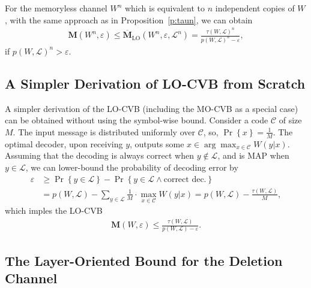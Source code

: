 \documentclass[journal, twocol]{IEEEtran}
\newcommand{\mC}{{\mathcal{C}}}
\newcommand{\mL}{{\mathcal{L}}}
\newcommand{\bfM}{{\mathbf{M}}}
\newcommand{\obfM}{{\overline{\mathbf{M}}}}
\newcommand{\set}[1]{{\left\{{#1}\right\}}}
\newcommand{\ve}{\varepsilon}
\begin{document}
For the memoryless channel $W^n$ which is equivalent to $n$ independent copies of $W$, with the same approach as in Proposition~\ref{p:taun}, we can obtain
\begin{align}
\bfM(W^n,\ve)\leq \obfM_\text{LO}(W^n,\ve,\mL^n) = \frac{\tau(W,\mL)^n}{p(W,\mL)^n-\ve},
\label{eq:locvbn}    
\end{align}
if $p(W,\mL)^n>\ve$.

\subsection{A Simpler Derivation of LO-CVB from Scratch}
\label{s:mos}

A simpler derivation of the LO-CVB (including the MO-CVB as a special case) can be obtained without using the symbol-wise bound.
Consider a code $\mC$ of size $M$.
The input message is distributed uniformly over $\mC$, so, $\Pr\set{x}=\frac{1}{M}$.
The optimal decoder, upon receiving $y$, outputs some $x\in\arg\max_{x\in\mC}W(y|x)$.
Assuming that the decoding is always correct when $y\notin\mL$, and is MAP when $y\in\mL$, we can lower-bound the probability of decoding error by
\begin{align}
\ve &\geq  \Pr\set{y\in\mL}-\Pr\set{y\in\mL \wedge \text{correct dec.}} \nonumber\\&
= p(W,\mL)-\sum_{y \in\mL} \frac{1}{M} \cdot \max_{x\in\mC} W(y|x) 
= p(W,\mL)-\frac{\tau(W,\mL)}{M},
\label{eq:locvbd}
\end{align}
which imples the LO-CVB
\begin{align}
\bfM(W,\ve) \leq \frac{\tau(W,\mL)}{p(W,\mL)-\ve}.
\label{eq:locvbs}
\end{align}


\subsection{The Layer-Oriented Bound for the Deletion Channel}
\end{document}
